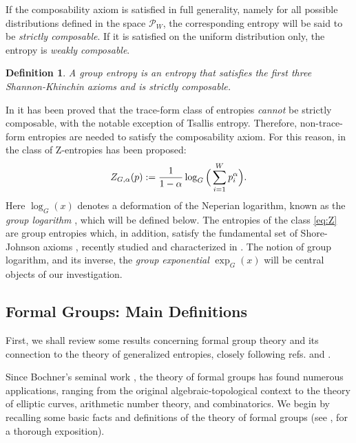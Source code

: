 \documentclass[10pt]{amsart}
\newtheorem{definition}{Definition}
\theoremstyle{definition}
\theoremstyle{definition}	 %
\begin{document}
If the composability axiom is satisfied in full generality, namely for all possible distributions defined in the space $\mathcal{P}_W$, the corresponding entropy will be said to be
\emph{strictly composable}.
If it is satisfied on the uniform distribution only, the entropy is \textit{weakly composable}.
\begin{definition}
A group entropy is an entropy that satisfies the first three Shannon-Khinchin axioms and is strictly composable.
\end{definition}
In \cite{ET2017JSTAT} it has been proved that the trace-form class of entropies \textit{cannot} be strictly composable, with the notable exception of Tsallis entropy. Therefore, non-trace-form entropies are needed to satisfy the composability axiom. For this reason, in \cite{tempesta2016} the class of Z-entropies has been proposed:
\begin{equation}  \label{eq:Z}
Z_{G,\alpha }(p):=\frac{1}{1-\alpha }\log _{G}\Big(\sum_{i=1}^{W}p_{i}^{%
\alpha }\Big).
\end{equation}
Here $\log_{G}(x)$ denotes a deformation of the Neperian logarithm, known as the \textit{group logarithm} \cite{PT2011PRE}, which will be defined below.
The entropies of the class \eqref{eq:Z} are group entropies which, in addition, satisfy the fundamental set of Shore-Johnson axioms \cite{SJ1,SJ2}, recently studied and characterized in \cite{JK2019}.
The notion of group logarithm, and its inverse, the \textit{group exponential} $\exp_{G}(x)$ will be central objects of our investigation.




\subsection{Formal Groups: Main Definitions}
First, we shall review some results concerning formal group theory and its connection to the theory of generalized entropies, closely following  refs. \cite{PT2016AOP} and \cite{tempesta2016}.


Since Bochner's seminal work  \cite{Bochner1946}, the theory of formal groups has found numerous applications, ranging from the original algebraic-topological context to the theory of elliptic curves, arithmetic number theory, and combinatorics. We begin by recalling some basic facts and definitions of the theory of formal groups (see \cite{Haze}, \cite{Serre}  for a thorough exposition).
\end{document}
